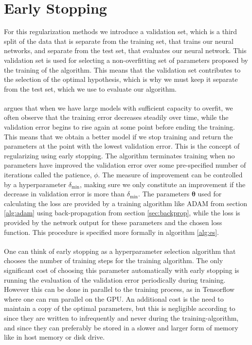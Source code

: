 \clearpage
\section{Early Stopping} \label{sec:early_stopping}
For this regularization methods we introduce a validation set, which is a third split of the data that is separate from the training set, that trains our neural networks, and separate from the test set, that evaluates our neural network. This validation set is used for selecting a non-overfitting set of parameters proposed by the training of the algorithm. This means that the validation set contributes to the selection of the optimal hypothesis, which is why we must keep it separate from the test set, which we use to evaluate our algorithm.
\\
\\
\cite{Goodfellow-et-al-2016} argues that when we have large models with sufficient capacity to overfit, we often observe that the training error decreases steadily over time, while the validation error begins to rise again at some point before ending the training. This means that we obtain a better model if we stop training and return the parameters at the point with the lowest validation error. This is the concept of regularizing using early stopping. The algorithm terminates training when no parameters have improved the validation error over some pre-specified number of iterations called the patience, $\phi$. The measure of improvement can be controlled by a hyperparameter $\delta_{\text{min}}$, making sure we only constitute an improvement if the decrease in validation error is more than $\delta_{\text{min}}$. The parameters $\boldsymbol{\theta}$ used for calculating the loss are provided by a training algorithm like ADAM from section \ref{alg:adam} using back-propagation from section \ref{sec:backprop}, while the loss is provided by the network output for these parameters and the chosen loss function. This procedure is specified more formally in algorithm \ref{alg:es}.\\
\\
One can think of early stopping as a hyperparameter selection algorithm that chooses the number of training steps for the training algorithm. The only significant cost of choosing this parameter automatically with early stopping is running the evaluation of the validation error periodically during training. However this can be done in parallel to the training process, as in Tensorflow where one can run parallel on the GPU. An additional cost is the need to maintain a copy of the optimal parameters, but this is negligible according to \cite{Goodfellow-et-al-2016} since they are written to infrequently and never during the training-algorithm, and since they can preferably be stored in a slower and larger form of memory like in host memory or disk drive. 

